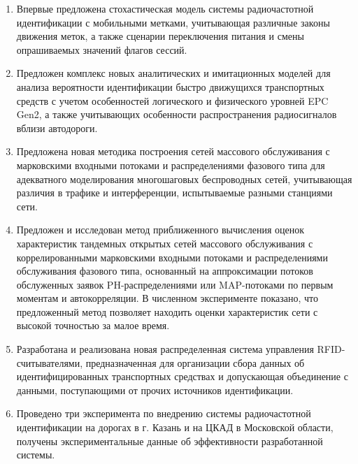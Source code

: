 {\novelty}
\begin{enumerate}[beginpenalty=10000] %
  \item Впервые предложена стохастическая модель системы радиочастотной идентификации с мобильными метками, учитывающая различные законы движения меток, а также сценарии переключения питания и смены опрашиваемых значений флагов сессий.
  \item Предложен комплекс новых аналитических и имитационных моделей для анализа вероятности идентификации быстро движущихся транспортных средств с учетом особенностей логического и физического уровней EPC Gen2, а также учитывающих особенности распространения радиосигналов вблизи автодороги.
  \item Предложена новая методика построения сетей массового обслуживания с марковскими входными потоками и распределениями фазового типа для адекватного моделирования многошаговых беспроводных сетей, учитывающая различия в трафике и интерференции, испытываемые разными станциями сети.
  \item Предложен и исследован метод приближенного вычисления оценок характеристик тандемных открытых сетей массового обслуживания с коррелированными марковскими входными потоками и распределениями обслуживания фазового типа, основанный на аппроксимации потоков обслуженных заявок PH-распределениями или MAP-потоками по первым моментам и автокорреляции. В численном эксперименте показано, что предложенный метод позволяет находить оценки характеристик сети с высокой точностью за малое время.
  \item Разработана и реализована новая распределенная система управления RFID-считывателями, предназначенная для организации сбора данных об идентифицированных транспортных средствах и допускающая объединение с данными, поступающими от прочих источников идентификации.
  \item Проведено три эксперимента по внедрению системы радиочастотной идентификации на дорогах в г. Казань и на ЦКАД в Московской области, получены экспериментальные данные об эффективности разработанной системы.
\end{enumerate}

